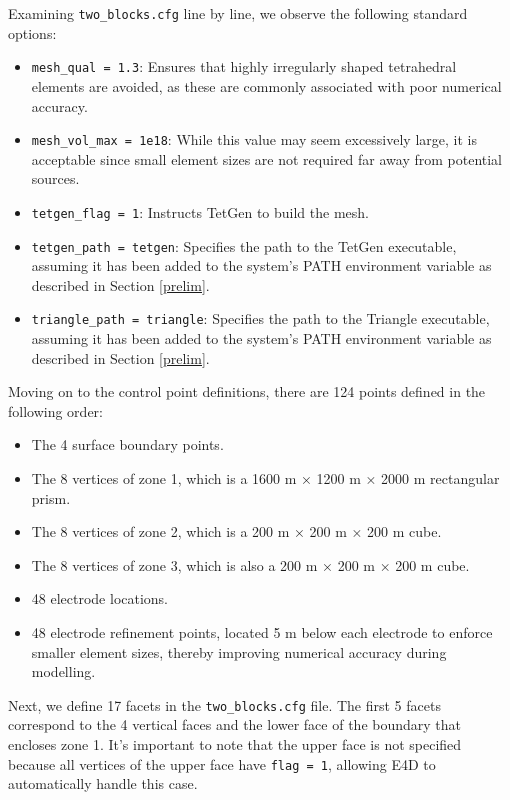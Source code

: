 \documentclass[a4paper,12pt]{article}
\begin{document}
Examining \texttt{two\_blocks.cfg} line by line, we observe the following standard options:

\begin{itemize}
    \item \texttt{mesh\_qual = 1.3}: Ensures that highly irregularly shaped tetrahedral elements are avoided, as these are commonly associated with poor numerical accuracy.
    \item \texttt{mesh\_vol\_max = 1e18}: While this value may seem excessively large, it is acceptable since small element sizes are not required far away from potential sources.
    \item \texttt{tetgen\_flag = 1}: Instructs TetGen to build the mesh.
    \item \texttt{tetgen\_path = tetgen}: Specifies the path to the TetGen executable, assuming it has been added to the system's PATH environment variable as described in Section \ref{prelim}.
    \item \texttt{triangle\_path = triangle}: Specifies the path to the Triangle executable, assuming it has been added to the system's PATH environment variable as described in Section \ref{prelim}.
\end{itemize}

Moving on to the control point definitions, there are 124 points defined in the following order:

\begin{itemize}
    \item The 4 surface boundary points.
    \item The 8 vertices of zone 1, which is a 1600 m × 1200 m × 2000 m rectangular prism.
    \item The 8 vertices of zone 2, which is a 200 m × 200 m × 200 m cube.
    \item The 8 vertices of zone 3, which is also a 200 m × 200 m × 200 m cube.
    \item 48 electrode locations.
    \item 48 electrode refinement points, located 5 m below each electrode to enforce smaller element sizes, thereby improving numerical accuracy during modelling.
\end{itemize}

Next, we define 17 facets in the \texttt{two\_blocks.cfg} file. The first 5 facets correspond to the 4 vertical faces and the lower face of the boundary that encloses zone 1. It’s important to note that the upper face is not specified because all vertices of the upper face have \texttt{flag = 1}, allowing E4D to automatically handle this case.
\end{document}

